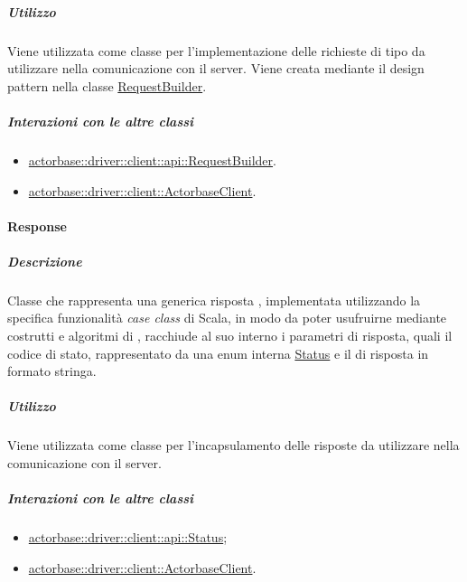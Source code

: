 \documentclass{scalatekids-article}
\begin{document}
\subparagraph{Utilizzo}

Viene utilizzata come classe per l'implementazione delle richieste 
di tipo  da utilizzare nella comunicazione con il server. Viene
creata mediante il design pattern  nella classe
\hyperref[sec:actorbase::driver::client::api::RequestBuilder]{RequestBuilder}.

\subparagraph{Interazioni con le altre classi}

\begin{itemize}
\item \hyperref[sec:actorbase::driver::client::api::RequestBuilder]{actorbase::driver::client::api::RequestBuilder}.
\item \hyperref[sec:actorbase::driver::client::ActorbaseClient]{actorbase::driver::client::ActorbaseClient}.
\end{itemize}

\paragraph{Response}
\label{sec:actorbase::driver::client::api::Response}

\subparagraph{Descrizione}

Classe che rappresenta una generica risposta , implementata
utilizzando la specifica funzionalità \textit{case class} di Scala, in modo da
poter usufruirne mediante costrutti e algoritmi di ,
racchiude al suo interno i parametri di risposta, quali il codice di stato,
rappresentato da una enum interna
\hyperref[sec:actorbase::driver::client::api::Status]{Status} e il
 di risposta in formato stringa.

\subparagraph{Utilizzo}

Viene utilizzata come classe per l'incapsulamento delle risposte  da
utilizzare nella comunicazione con il server.

\subparagraph{Interazioni con le altre classi}

\begin{itemize}
\item \hyperref[sec:actorbase::driver::client::api::Status]{actorbase::driver::client::api::Status};
\item \hyperref[sec:actorbase::driver::client::ActorbaseClient]{actorbase::driver::client::ActorbaseClient}.
\end{itemize}

\end{document}
